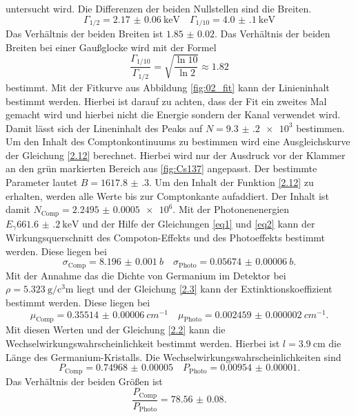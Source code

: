 untersucht wird.
Die Differenzen der beiden Nullstellen sind die Breiten.
\begin{equation*}
  \Gamma_{1/2} = \SI{2.17(6)}{\kilo\eV}\quad \Gamma_{1/10} = \SI{4.0(1)}{\kilo\eV}
\end{equation*}
Das Verhältnis der beiden Breiten ist $\num{1.85(2)}$. Das Verhältnis der beiden Breiten bei einer Gaußglocke wird 
mit der Formel
\begin{equation*}
  \frac{\Gamma_{1/10}}{\Gamma_{1/2}}= \sqrt{\frac{\ln{10}}{\ln{2}}} \approx \num{1.82}
\end{equation*}
bestimmt.
Mit der Fitkurve aus Abbildung \ref{fig:02_fit} kann der Linieninhalt bestimmt werden. Hierbei ist darauf zu achten, dass der Fit ein zweites Mal gemacht wird 
und hierbei nicht die Energie sondern der Kanal verwendet wird. Damit lässt sich der Lineninhalt des Peaks auf $N=\num{9.3(2)e3}$ bestimmen.
Um den Inhalt des Comptonkontinuums zu bestimmen wird eine Ausgleichskurve der Gleichung \ref{2.12} berechnet.
Hierbei wird nur der Ausdruck vor der Klammer an den grün markierten Bereich aus \ref{fig:Cs137} angepasst.
Der bestimmte Parameter lautet $B=\num{1617.8(3)}$. Um den Inhalt der Funktion \ref{2.12} zu erhalten,
werden alle Werte bis zur Comptonkante aufaddiert. Der Inhalt ist damit $N_{\text{Comp}} = \num{2.2495(5)e6}$.
Mit der Photonenenergien $E_{\gamma}\SI{661.6(2)}{\kilo\eV}$ und der Hilfe der Gleichungen \eqref{eq1} und 
\eqref{eq2} kann der Wirkungsquerschnitt des Compoton-Effekts und des Photoeffekts bestimmt werden.
Diese liegen bei 
\begin{equation*}
  \sigma_{\text{Comp}}=\SI{8.196(1)}{b} \quad \sigma_{\text{Photo}}=\SI{0.05674(6)}{b}.
\end{equation*} 
Mit der Annahme das die Dichte von Germanium im Detektor bei $\rho = \SI{5.323}{\gram\per\cubic\centi\meter}$ \cite{Germanium_rho} liegt und der
Gleichung \eqref{2.3} kann der Extinktionskoeffizient bestimmt werden.
Diese liegen bei 
\begin{equation*}
  \mu_{\text{Comp}} = \SI{0.35514(6)}{cm^{-1}} \quad \mu_{\text{Photo}} = \SI{0.002459(2)}{cm^{-1}}.
\end{equation*}
Mit diesen Werten und der Gleichung \eqref{2.2} kann die Wechselwirkungswahrscheinlichkeit bestimmt werden.
Hierbei ist $l=\SI{3.9}{\centi\meter}$ die Länge des Germanium-Kristalls.
Die Wechselwirkungswahrscheinlichkeiten sind 
\begin{equation*}
  P_{\text{Comp}} = \num{0.74968(5)}\quad P_{\text{Photo}} = \num{0.00954(1)}.
\end{equation*}
Das Verhältnis der beiden Größen ist
\begin{equation*}
  \frac{P_{\text{Comp}} }{P_{\text{Photo}}} = \num{78.56(8)}.
\end{equation*}

